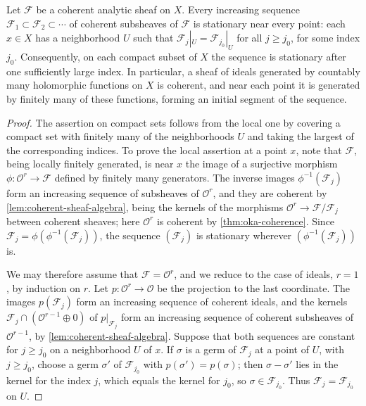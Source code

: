 \begin{lemma}\label{lem:strong-analytic-noetherian}
Let $\mathcal F$ be a coherent analytic sheaf on $X$. Every increasing sequence $\mathcal F_1\subset\mathcal F_2\subset\cdots$ of coherent subsheaves of $\mathcal F$ is stationary near every point: each $x\in X$ has a neighborhood $U$ such that $\mathcal F_j|_U=\mathcal F_{j_0}|_U$ for all $j\geq j_0$, for some index $j_0$. Consequently, on each compact subset of $X$ the sequence is stationary after one sufficiently large index. In particular, a sheaf of ideals generated by countably many holomorphic functions on $X$ is coherent, and near each point it is generated by finitely many of these functions, forming an initial segment of the sequence.
\end{lemma}
\begin{proof}
The assertion on compact sets follows from the local one by covering a compact set with finitely many of the neighborhoods $U$ and taking the largest of the corresponding indices. To prove the local assertion at a point $x$, note that $\mathcal F$, being locally finitely generated, is near $x$ the image of a surjective morphism $\phi\colon\mathcal O^r\to\mathcal F$ defined by finitely many generators. The inverse images $\phi^{-1}(\mathcal F_j)$ form an increasing sequence of subsheaves of $\mathcal O^r$, and they are coherent by \cref{lem:coherent-sheaf-algebra}, being the kernels of the morphisms $\mathcal O^r\to\mathcal F/\mathcal F_j$ between coherent sheaves; here $\mathcal O^r$ is coherent by \cref{thm:oka-coherence}. Since $\mathcal F_j=\phi(\phi^{-1}(\mathcal F_j))$, the sequence $(\mathcal F_j)$ is stationary wherever $(\phi^{-1}(\mathcal F_j))$ is.

We may therefore assume that $\mathcal F=\mathcal O^r$, and we reduce to the case of ideals, $r=1$, by induction on $r$. Let $p\colon\mathcal O^r\to\mathcal O$ be the projection to the last coordinate. The images $p(\mathcal F_j)$ form an increasing sequence of coherent ideals, and the kernels $\mathcal F_j\cap(\mathcal O^{r-1}\oplus0)$ of $p|_{\mathcal F_j}$ form an increasing sequence of coherent subsheaves of $\mathcal O^{r-1}$, by \cref{lem:coherent-sheaf-algebra}. Suppose that both sequences are constant for $j\geq j_0$ on a neighborhood $U$ of $x$. If $\sigma$ is a germ of $\mathcal F_j$ at a point of $U$, with $j\geq j_0$, choose a germ $\sigma'$ of $\mathcal F_{j_0}$ with $p(\sigma')=p(\sigma)$; then $\sigma-\sigma'$ lies in the kernel for the index $j$, which equals the kernel for $j_0$, so $\sigma\in\mathcal F_{j_0}$. Thus $\mathcal F_j=\mathcal F_{j_0}$ on $U$.


\end{proof}
